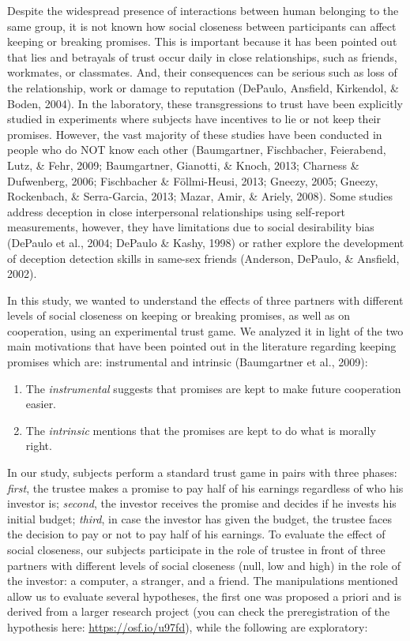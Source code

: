 \documentclass[12pt,]{article}
\begin{document}
Despite the widespread presence of interactions between human belonging
to the same group, it is not known how social closeness between
participants can affect keeping or breaking promises. This is important
because it has been pointed out that lies and betrayals of trust occur
daily in close relationships, such as friends, workmates, or classmates.
And, their consequences can be serious such as loss of the relationship,
work or damage to reputation (DePaulo, Ansfield, Kirkendol, \& Boden,
2004). In the laboratory, these transgressions to trust have been
explicitly studied in experiments where subjects have incentives to lie
or not keep their promises. However, the vast majority of these studies
have been conducted in people who do NOT know each other (Baumgartner,
Fischbacher, Feierabend, Lutz, \& Fehr, 2009; Baumgartner, Gianotti, \&
Knoch, 2013; Charness \& Dufwenberg, 2006; Fischbacher \& Föllmi-Heusi,
2013; Gneezy, 2005; Gneezy, Rockenbach, \& Serra-Garcia, 2013; Mazar,
Amir, \& Ariely, 2008). Some studies address deception in close
interpersonal relationships using self-report measurements, however,
they have limitations due to social desirability bias (DePaulo et al.,
2004; DePaulo \& Kashy, 1998) or rather explore the development of
deception detection skills in same-sex friends (Anderson, DePaulo, \&
Ansfield, 2002).

In this study, we wanted to understand the effects of three partners
with different levels of social closeness on keeping or breaking
promises, as well as on cooperation, using an experimental trust game.
We analyzed it in light of the two main motivations that have been
pointed out in the literature regarding keeping promises which are:
instrumental and intrinsic (Baumgartner et al., 2009):

\begin{enumerate}
\def\labelenumi{\arabic{enumi}.}
\item
  The \emph{instrumental} suggests that promises are kept to make future
  cooperation easier.
\item
  The \emph{intrinsic} mentions that the promises are kept to do what is
  morally right.
\end{enumerate}

In our study, subjects perform a standard trust game in pairs with three
phases: \emph{first}, the trustee makes a promise to pay half of his
earnings regardless of who his investor is; \emph{second}, the investor
receives the promise and decides if he invests his initial budget;
\emph{third}, in case the investor has given the budget, the trustee
faces the decision to pay or not to pay half of his earnings. To
evaluate the effect of social closeness, our subjects participate in the
role of trustee in front of three partners with different levels of
social closeness (null, low and high) in the role of the investor: a
computer, a stranger, and a friend. The manipulations mentioned allow us
to evaluate several hypotheses, the first one was proposed a priori and
is derived from a larger research project (you can check the
preregistration of the hypothesis here: \url{https://osf.io/u97fd}),
while the following are exploratory:
\end{document}
